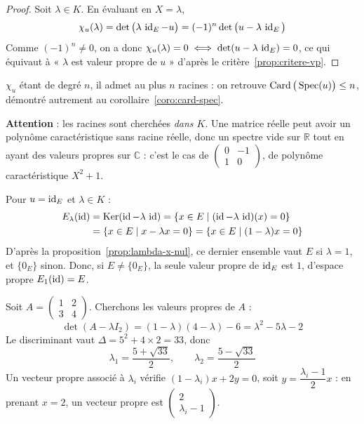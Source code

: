 \begin{proof}
Soit $\lambda\in K$. En évaluant en $X=\lambda$,
\[\chi_u(\lambda) = \det\big(\lambda\,\operatorname{id}_E-u\big) = (-1)^n\det\big(u-\lambda\,\operatorname{id}_E\big)\]
Comme $(-1)^n\neq 0$, on a donc $\chi_u(\lambda)=0 \iff \det(u-\lambda\,\operatorname{id}_E)=0$, ce qui équivaut à « $\lambda$ est valeur propre de $u$ » d'après le critère~\ref{prop:critere-vp}.
\end{proof}

\begin{remarque}
$\chi_u$ étant de degré $n$, il admet au plus $n$ racines : on retrouve $\operatorname{Card}\big(\operatorname{Spec}(u)\big)\leq n$, démontré autrement au corollaire~\ref{coro:card-spec}.

\textbf{Attention} : les racines sont cherchées \emph{dans $K$}. Une matrice réelle peut avoir un polynôme caractéristique sans racine réelle, donc un spectre vide sur $\mathbb{R}$ tout en ayant des valeurs propres sur $\mathbb{C}$ : c'est le cas de $\begin{pmatrix} 0 & -1 \\ 1 & 0\end{pmatrix}$, de polynôme caractéristique $X^2+1$.
\end{remarque}


\begin{exemple}
Pour $u=\operatorname{id}_E$ et $\lambda\in K$ :
\begin{align*}
E_\lambda(\operatorname{id}) &= \operatorname{Ker}(\operatorname{id}-\lambda\,\operatorname{id}) = \{x\in E \mid (\operatorname{id}-\lambda\,\operatorname{id})(x)=0\} \\
&= \{x\in E \mid x-\lambda x=0\} = \{x\in E \mid (1-\lambda)x=0\}
\end{align*}
D'après la proposition~\ref{prop:lambda-x-nul}, ce dernier ensemble vaut $E$ si $\lambda=1$, et $\{0_E\}$ sinon. Donc, si $E\neq\{0_E\}$, la seule valeur propre de $\operatorname{id}_E$ est $1$, d'espace propre $E_1(\operatorname{id})=E$.
\end{exemple}

\begin{exemple}
\label{ex:matrice-1234}
Soit $A=\begin{pmatrix} 1 & 2 \\ 3 & 4 \end{pmatrix}$. Cherchons les valeurs propres de $A$ :
\[\det(A-\lambda I_2) = (1-\lambda)(4-\lambda) - 6 = \lambda^2-5\lambda-2\]
Le discriminant vaut $\Delta = 5^2+4\times 2 = 33$, donc
\[\lambda_1 = \frac{5+\sqrt{33}}{2}, \qquad \lambda_2 = \frac{5-\sqrt{33}}{2}\]
Un vecteur propre associé à $\lambda_i$ vérifie $(1-\lambda_i)x+2y=0$, soit $y=\dfrac{\lambda_i-1}{2}x$ : en prenant $x=2$, un vecteur propre est $\begin{pmatrix} 2 \\ \lambda_i-1\end{pmatrix}$.
\end{exemple}

